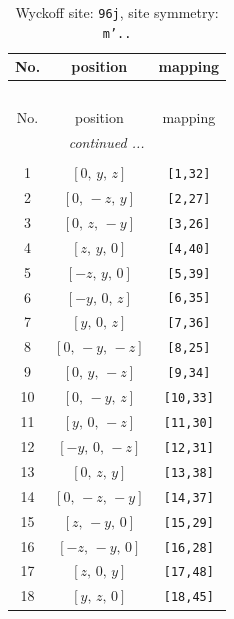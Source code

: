 \documentclass[fleqn,8pt]{jsarticle}
\begin{document}
\begin{longtable}{ccc}
\caption{Wyckoff site: {\tt 96j}, site symmetry: {\tt m'..}}
 \\
 \hline \hline
No. & position & mapping \\ \hline \endfirsthead

\multicolumn{2}{l}{\tablename\ \thetable{}} \\
 \hline \hline
No. & position & mapping \\ \hline \endhead

 \hline \hline
\multicolumn{2}{r}{\footnotesize\it continued ...} \\ \endfoot

 \hline \hline
\multicolumn{2}{r}{} \\ \endlastfoot

1 & $\left[ 0,\, y,\, z \right]$ & {\tt [1,32]} \\ \hline
2 & $\left[ 0,\, - z,\, y \right]$ & {\tt [2,27]} \\ \hline
3 & $\left[ 0,\, z,\, - y \right]$ & {\tt [3,26]} \\ \hline
4 & $\left[ z,\, y,\, 0 \right]$ & {\tt [4,40]} \\ \hline
5 & $\left[ - z,\, y,\, 0 \right]$ & {\tt [5,39]} \\ \hline
6 & $\left[ - y,\, 0,\, z \right]$ & {\tt [6,35]} \\ \hline
7 & $\left[ y,\, 0,\, z \right]$ & {\tt [7,36]} \\ \hline
8 & $\left[ 0,\, - y,\, - z \right]$ & {\tt [8,25]} \\ \hline
9 & $\left[ 0,\, y,\, - z \right]$ & {\tt [9,34]} \\ \hline
10 & $\left[ 0,\, - y,\, z \right]$ & {\tt [10,33]} \\ \hline
11 & $\left[ y,\, 0,\, - z \right]$ & {\tt [11,30]} \\ \hline
12 & $\left[ - y,\, 0,\, - z \right]$ & {\tt [12,31]} \\ \hline
13 & $\left[ 0,\, z,\, y \right]$ & {\tt [13,38]} \\ \hline
14 & $\left[ 0,\, - z,\, - y \right]$ & {\tt [14,37]} \\ \hline
15 & $\left[ z,\, - y,\, 0 \right]$ & {\tt [15,29]} \\ \hline
16 & $\left[ - z,\, - y,\, 0 \right]$ & {\tt [16,28]} \\ \hline
17 & $\left[ z,\, 0,\, y \right]$ & {\tt [17,48]} \\ \hline
18 & $\left[ y,\, z,\, 0 \right]$ & {\tt [18,45]} \\ \hline

\end{longtable}
\end{document}
